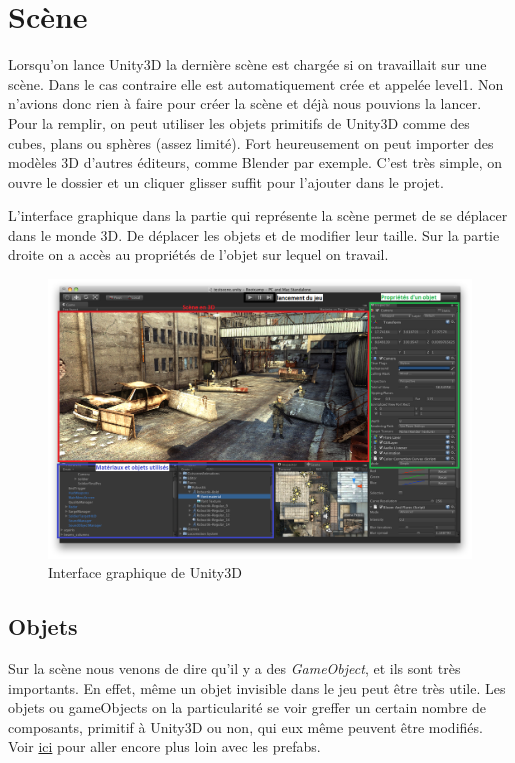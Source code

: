 \documentclass[a4paper,11pt]{myreport}
\begin{document}
	\section{Scène}
	\par Lorsqu'on lance Unity3D la dernière scène est chargée si on travaillait sur une scène. Dans le cas contraire elle est automatiquement crée et appelée level1. Non n'avions donc rien à faire pour créer la scène et déjà nous pouvions la lancer.
	Pour la remplir, on peut utiliser les objets primitifs de Unity3D comme des cubes, plans ou sphères (assez limité). Fort heureusement on peut importer des modèles 3D d'autres éditeurs, comme Blender par exemple. C'est très simple, on ouvre le dossier et un cliquer glisser suffit pour l'ajouter dans le projet.
	\par L'interface graphique dans la partie qui représente la scène permet de se déplacer dans le monde 3D. De déplacer les objets et de modifier leur taille.
	Sur la partie droite on a accès au propriétés de l'objet sur lequel on travail.
	\begin{figure}[h]
	\includegraphics[scale=0.35]{./images/unity-3D_interface.png}
	\caption{Interface graphique de Unity3D}
	\end{figure}
	
	\newpage
	\subsection{Objets}
	\par Sur la scène nous venons de dire qu'il y a des \textit{GameObject}, et ils sont très importants. En effet, même un objet invisible dans le jeu peut être très utile.
	Les objets ou gameObjects on la particularité se voir greffer un certain nombre de composants, primitif à Unity3D ou non, qui eux même peuvent être modifiés. Voir \hyperlink{prefabTarget}{ici} pour aller encore plus loin avec les prefabs.
\end{document}
